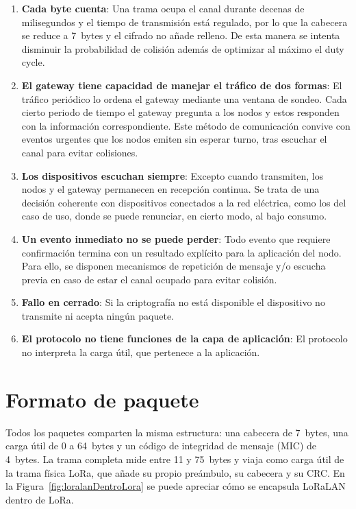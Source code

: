 \begin{enumerate}

\item \textbf{Cada byte cuenta}: Una trama ocupa el canal durante decenas de milisegundos y el tiempo de transmisión está regulado, por lo que la cabecera se reduce a 7~bytes y el cifrado no añade relleno. De esta manera se intenta disminuir la probabilidad de colisión además de optimizar al máximo el duty cycle.

\item \textbf{El gateway tiene capacidad de manejar el tráfico de dos formas}: El tráfico periódico lo ordena el gateway mediante una ventana de sondeo. Cada cierto periodo de tiempo el gateway pregunta a los nodos y estos responden con la información correspondiente. Este método de comunicación convive con eventos urgentes que los nodos emiten sin esperar turno, tras escuchar el canal para evitar colisiones.

\item \textbf{Los dispositivos escuchan siempre}: Excepto cuando transmiten, los nodos y el gateway permanecen en recepción continua. Se trata de una decisión coherente con dispositivos conectados a la red eléctrica, como los del caso de uso, donde se puede renunciar, en cierto modo, al bajo consumo.

\item \textbf{Un evento inmediato no se puede perder}: Todo evento que requiere confirmación termina con un resultado explícito para la aplicación del nodo. Para ello, se disponen mecanismos de repetición de mensaje y/o escucha previa en caso de estar el canal ocupado para evitar colisión.

\item \textbf{Fallo en cerrado}: Si la criptografía no está disponible el dispositivo no transmite ni acepta ningún paquete.

\item \textbf{El protocolo no tiene funciones de la capa de aplicación}: El protocolo no interpreta la carga útil, que pertenece a la aplicación.
\end{enumerate}

\section{Formato de paquete}\label{sec:trama}

Todos los paquetes comparten la misma estructura: una cabecera de 7~bytes, una carga útil de 0 a 64~bytes y un código de integridad de mensaje (MIC) de 4~bytes. La trama completa mide entre 11 y 75~bytes y viaja como carga útil de la trama física LoRa, que añade su propio preámbulo, su cabecera y su CRC. En la Figura~\ref{fig:loralanDentroLora} se puede apreciar cómo se encapsula LoRaLAN dentro de LoRa.

